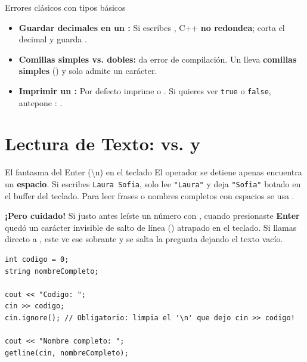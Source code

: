 \documentclass[11pt,letterpaper]{article}
\begin{document}
\begin{peligro}{Errores clásicos con tipos básicos}
\begin{itemize}
  \item \textbf{Guardar decimales en un :} Si escribes , C++ \textbf{no redondea}; corta el decimal y guarda .
  \item \textbf{Comillas simples vs. dobles:}  da error de compilación. Un  lleva \textbf{comillas simples} () y solo admite un carácter.
  \item \textbf{Imprimir un :} Por defecto  imprime  o . Si quieres ver \texttt{true} o \texttt{false}, antepone : .
\end{itemize}
\end{peligro}

\section{Lectura de Texto: \texorpdfstring{}{cin >>} vs. \texorpdfstring{}{getline()} y \texorpdfstring{}{cin.ignore()}}

\begin{paratontos}{El fantasma del Enter (\textbackslash n) en el teclado}
El operador  se detiene apenas encuentra un \textbf{espacio}. Si escribes \texttt{Laura Sofia}, solo lee \texttt{"Laura"} y deja \texttt{"Sofia"} botado en el buffer del teclado. Para leer frases o nombres completos con espacios se usa .

\medskip
\textbf{¡Pero cuidado!} Si justo antes leíste un número con , cuando presionaste \textbf{Enter} quedó un carácter invisible de salto de línea () atrapado en el teclado. Si llamas directo a , este ve ese  sobrante y se salta la pregunta dejando el texto vacío.
\end{paratontos}

\begin{lstlisting}[style=cppmonitoria, caption={Patrón seguro para mezclar cin y getline en C++}]
int codigo = 0;
string nombreCompleto;

cout << "Codigo: ";
cin >> codigo;
cin.ignore(); // Obligatorio: limpia el '\n' que dejo cin >> codigo!

cout << "Nombre completo: ";
getline(cin, nombreCompleto);
\end{lstlisting}
\end{document}
